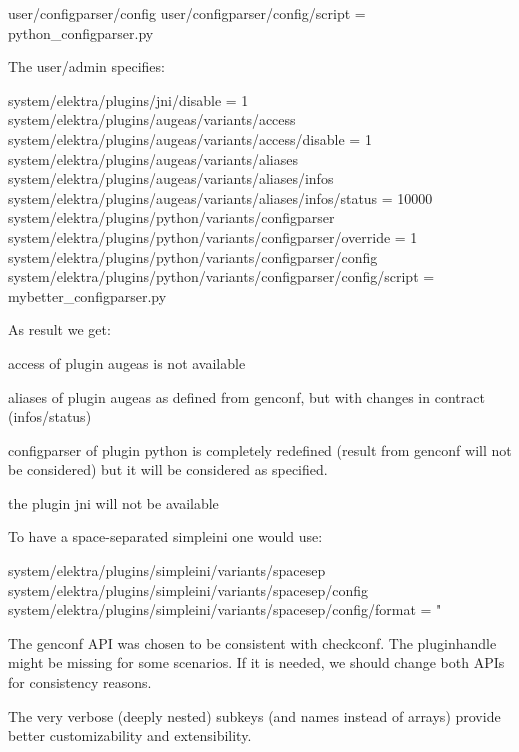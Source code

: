 \begin{DoxyCode}
user/configparser/config
user/configparser/config/script = python\_configparser.py
\end{DoxyCode}


The user/admin specifies\+:


\begin{DoxyCode}
system/elektra/plugins/jni/disable = 1
system/elektra/plugins/augeas/variants/access
system/elektra/plugins/augeas/variants/access/disable = 1
system/elektra/plugins/augeas/variants/aliases
system/elektra/plugins/augeas/variants/aliases/infos
system/elektra/plugins/augeas/variants/aliases/infos/status = 10000
system/elektra/plugins/python/variants/configparser
system/elektra/plugins/python/variants/configparser/override = 1
system/elektra/plugins/python/variants/configparser/config
system/elektra/plugins/python/variants/configparser/config/script = mybetter\_configparser.py
\end{DoxyCode}


As result we get\+:


\begin{DoxyEnumerate}
\item {\ttfamily access} of plugin {\ttfamily augeas} is not available
\item {\ttfamily aliases} of plugin {\ttfamily augeas} as defined from {\ttfamily genconf}, but with changes in contract ({\ttfamily infos/status})
\item {\ttfamily configparser} of plugin {\ttfamily python} is completely redefined (result from {\ttfamily genconf} will not be considered) but it will be considered as specified.
\item the plugin {\ttfamily jni} will not be available
\end{DoxyEnumerate}

To have a space-\/separated simpleini one would use\+:


\begin{DoxyCode}
system/elektra/plugins/simpleini/variants/spacesep
system/elektra/plugins/simpleini/variants/spacesep/config
system/elektra/plugins/simpleini/variants/spacesep/config/format = "%
\end{DoxyCode}



\begin{DoxyItemize}
\item The {\ttfamily genconf} A\+PI was chosen to be consistent with {\ttfamily checkconf}. The pluginhandle might be missing for some scenarios. If it is needed, we should change both A\+P\+Is for consistency reasons.
\item The very verbose (deeply nested) subkeys (and names instead of arrays) provide better customizability and extensibility.
\end{DoxyItemize}


